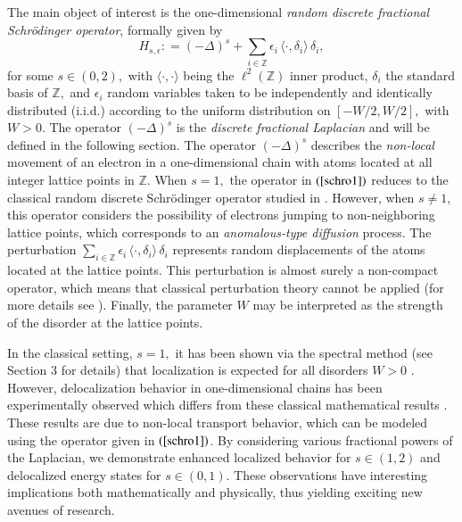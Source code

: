 \documentclass[final,1p,times]{elsarticle}
\def\ZZ{\mathbb Z} %
\newcommand{\bb}[1]{\begin{equation}\label{#1}}
\newcommand{\ee}{\end{equation}}
\def\R#1{$(\ref{#1})$}
\theoremstyle{remark}
\theoremstyle{definition}
\begin{document}
The main object of interest is the one-dimensional {\em random discrete fractional Schr{\"o}dinger operator}, formally given by
\bb{schro1}
H_{s,\epsilon} \mathrel{\mathop:}= (-\Delta)^s + \sum_{i\in\ZZ} \epsilon_i \,\langle \cdot, \delta_i\rangle\, \delta_i,
\ee
for some $s\in (0,2),$ with $\langle \cdot,\cdot\rangle$ being the $\ell^2(\ZZ)$ inner product, $\delta_i$ the standard basis of $\ZZ,$ and $\epsilon_i$ random variables taken to be independently and identically distributed (i.i.d.) according to the uniform distribution on $[-W/2,W/2],$ with $W>0.$ The operator $(-\Delta)^s$ is the {\em discrete fractional Laplacian} and will be defined in the following section. The operator $(-\Delta)^s$ describes the {\em non-local} movement of an electron in a one-dimensional chain with atoms located at all integer lattice points in $\ZZ.$ When $s=1,$ the operator in \R{schro1} reduces to the classical random discrete Schr{\"o}dinger operator studied in \cite{jakvsic2000spectral}. However, when $s\neq 1,$ this operator considers the possibility of electrons jumping to non-neighboring lattice points, which corresponds to an {\em anomalous-type diffusion} process. The perturbation $\textstyle\sum_{i\in\ZZ} \epsilon_i \,\langle \cdot, \delta_i\rangle\, \delta_i$ represents random displacements of the atoms located at the lattice points. This perturbation is almost surely a non-compact operator, which means that classical perturbation theory cannot be applied (for more details see \cite{birman2012spectral,kato2013perturbation}). Finally, the parameter $W$ may be interpreted as the strength of the disorder at the lattice points.

In the classical setting, $s=1,$ it has been shown via the spectral method (see Section 3 for details) that localization is expected for all disorders $W>0$ \cite{Liaw2013}. However, delocalization behavior in one-dimensional chains has been experimentally observed which differs from these classical mathematical results \cite{SHIMA2005422}. 
These results are due to non-local transport behavior, which can be modeled using the operator given in \R{schro1}.
By considering various fractional powers of the Laplacian, we demonstrate enhanced localized behavior for $s\in(1,2)$ and delocalized energy states for $s\in(0,1).$
These observations have interesting implications both mathematically and physically, thus yielding exciting new avenues of research.
\end{document}
